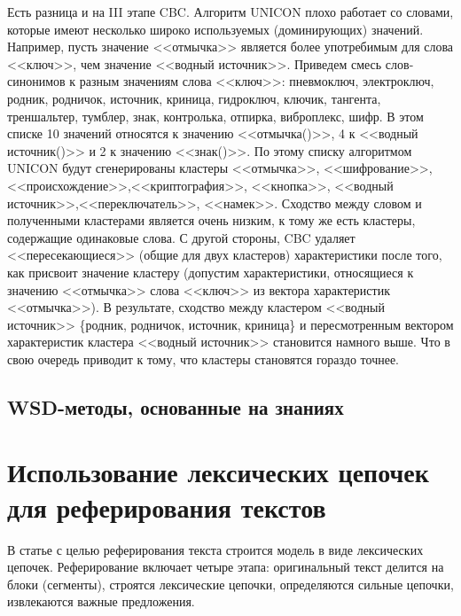 \documentclass{article}
\begin{document}
\begin{articletext}
Есть разница и на III этапе CBC. Алгоритм UNICON плохо работает со словами, которые имеют несколько широко используемых (доминирующих) значений. Например, пусть значение <<отмычка>> является более употребимым для слова <<ключ>>, чем значение <<водный источник>>. Приведем смесь слов-синонимов к разным значениям слова <<ключ>>: пневмоключ, электроключ, родник, родничок, источник, криница, гидроключ, ключик, тангента, треншальтер, тумблер, знак, контролька, отпирка, виброплекс, шифр. В этом списке 10 значений относятся к значению <<отмычка()>>, 4 к <<водный источник()>> и 2 к значению <<знак()>>. По этому списку алгоритмом UNICON будут сгенерированы кластеры <<отмычка>>, <<шифрование>>, <<происхождение>>,<<криптография>>, <<кнопка>>, <<водный источник>>,<<переключатель>>, <<намек>>. Сходство между словом и полученными кластерами  является очень низким, к тому же есть кластеры, содержащие одинаковые слова. С другой стороны, CBC удаляет <<пересекающиеся>> (общие для двух кластеров) характеристики после того, как присвоит значение кластеру (допустим характеристики, относящиеся к значению <<отмычка>> слова <<ключ>> из вектора характеристик <<отмычка>>). В результате, сходство между  кластером <<водный источник>> \{родник, родничок, источник, криница\} и пересмотренным вектором характеристик кластера <<водный источник>> становится намного выше. Что в свою очередь приводит к тому, что кластеры становятся гораздо точнее.

\bfullwidth
\begin{center}
\section{WSD-методы, основанные на знаниях}
\end{center}
\efullwidth

\section{Использование лексических цепочек для реферирования текстов}
\begin{flushright}
\end{flushright}

В статье \cite{Barzilay Elhadad 1997} с целью реферирования текста строится модель в виде лексических цепочек. Реферирование включает четыре этапа: оригинальный текст делится на блоки (сегменты), строятся лексические цепочки, определяются сильные цепочки, извлекаются важные предложения.


\end{articletext}
\end{document}
